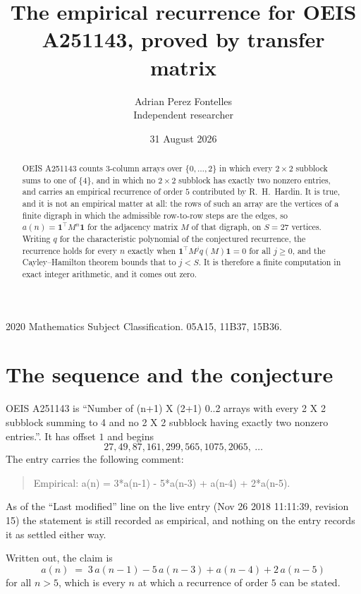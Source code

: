 \documentclass[11pt,a4paper]{article}
\title{The empirical recurrence for OEIS A251143, proved by transfer matrix}
\author{Adrian Perez Fontelles\\ \small Independent researcher}
\date{31 August 2026}
\theoremstyle{plain}
\theoremstyle{definition}
\begin{document}
\maketitle

\begin{abstract}
OEIS A251143 counts $3$-column arrays over $\{0,\dots,2\}$ in which every
$2\times2$ subblock sums to one of $\{4\}$, and in which no $2\times2$ subblock has exactly two nonzero entries, and carries an empirical
recurrence of order $5$ contributed by R.~H.~Hardin. It is true, and it is not an
empirical matter at all: the rows of such an array are the vertices of a finite digraph in
which the admissible row-to-row steps are the edges, so $a(n)=\mathbf{1}^{\!\top}M^{n}
\mathbf{1}$ for the adjacency matrix $M$ of that digraph, on $S=27$ vertices. Writing
$q$ for the characteristic polynomial of the conjectured recurrence, the recurrence holds
for every $n$ exactly when $\mathbf{1}^{\!\top}M^{j}q(M)\mathbf{1}=0$ for all
$j\ge0$, and the Cayley--Hamilton theorem bounds that to $j<S$. It is therefore a finite
computation in exact integer arithmetic, and it comes out zero.
\end{abstract}

\noindent\small 2020 Mathematics Subject Classification. 05A15, 11B37, 15B36.\normalsize

\section{The sequence and the conjecture}

OEIS A251143 is ``Number of (n+1) X (2+1) 0..2 arrays with every 2 X 2 subblock summing to 4 and no 2 X 2 subblock having exactly two nonzero entries.''. It has offset $1$
and begins
\[
27, 49, 87, 161, 299, 565, 1075, 2065,\ \dots
\]
The entry carries the following comment:
\begin{quote}\small
Empirical: a(n) = 3*a(n-1) - 5*a(n-3) + a(n-4) + 2*a(n-5).
\end{quote}
As of the ``Last modified'' line on the live entry (Nov 26 2018 11:11:39, revision 15) the statement is
still recorded as empirical, and nothing on the entry records it as settled either way.

Written out, the claim is
\begin{equation}\label{eq:conj}
a(n)\;=\;3\,a(n-1) - 5\,a(n-3) + a(n-4) + 2\,a(n-5)
\end{equation}
for all $n>5$, which is every $n$ at which a recurrence of order $5$ can be
stated.
\end{document}
